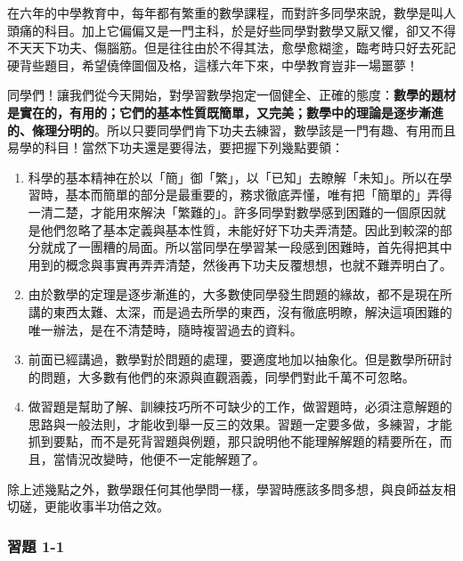 在六年的中學教育中，每年都有繁重的數學課程，而對許多同學來說，數學是叫人頭痛的科目。加上它偏偏又是一門主科，於是好些同學對數學又厭又懼，卻又不得不天天下功夫、傷腦筋。但是往往由於不得其法，愈學愈糊塗，臨考時只好去死記硬背些題目，希望僥倖圖個及格，這樣六年下來，中學教育豈非一場噩夢！

同學們！讓我們從今天開始，對學習數學抱定一個健全、正確的態度：\textbf{數學的題材是實在的，有用的；它們的基本性質既簡單，又完美；數學中的理論是逐步漸進的、條理分明的}。所以只要同學們肯下功夫去練習，數學該是一門有趣、有用而且易學的科目！當然下功夫還是要得法，要把握下列幾點要領：

\begin{enumerate}[(一)]
  \item 科學的基本精神在於以「簡」御「繁」，以「已知」去瞭解「未知」。所以在學習時，基本而簡單的部分是最重要的，務求徹底弄懂，唯有把「簡單的」弄得一清二楚，才能用來解決「繁難的」。許多同學對數學感到困難的一個原因就是他們忽略了基本定義與基本性質，未能好好下功夫弄清楚。因此到較深的部分就成了一團糟的局面。所以當同學在學習某一段感到困難時，首先得把其中用到的概念與事實再弄弄清楚，然後再下功夫反覆想想，也就不難弄明白了。
  \item 由於數學的定理是逐步漸進的，大多數使同學發生問題的緣故，都不是現在所講的東西太難、太深，而是過去所學的東西，沒有徹底明瞭，解決這項困難的唯一辦法，是在不清楚時，隨時複習過去的資料。
  \item 前面已經講過，數學對於問題的處理，要適度地加以抽象化。但是數學所研討的問題，大多數有他們的來源與直觀涵義，同學們對此千萬不可忽略。
  \item 做習題是幫助了解、訓練技巧所不可缺少的工作，做習題時，必須注意解題的思路與一般法則，才能收到舉一反三的效果。習題一定要多做，多練習，才能抓到要點，而不是死背習題與例題，那只說明他不能理解解題的精要所在，而且，當情況改變時，他便不一定能解題了。
\end{enumerate}

除上述幾點之外，數學跟任何其他學問一樣，學習時應該多問多想，與良師益友相切磋，更能收事半功倍之效。

\subsubsection*{習題 1-1}\label{sec:ex1-1}

